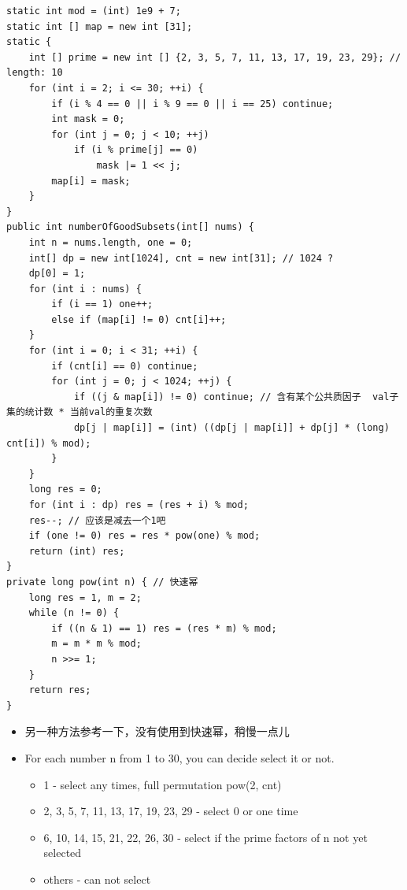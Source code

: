 \documentclass[9pt, b5paper]{article}
\begin{document}
\begin{verbatim}
static int mod = (int) 1e9 + 7;
static int [] map = new int [31];
static {
    int [] prime = new int [] {2, 3, 5, 7, 11, 13, 17, 19, 23, 29}; // length: 10
    for (int i = 2; i <= 30; ++i) {
        if (i % 4 == 0 || i % 9 == 0 || i == 25) continue;
        int mask = 0;
        for (int j = 0; j < 10; ++j) 
            if (i % prime[j] == 0)
                mask |= 1 << j;
        map[i] = mask;
    }
}
public int numberOfGoodSubsets(int[] nums) {
    int n = nums.length, one = 0;
    int[] dp = new int[1024], cnt = new int[31]; // 1024 ?
    dp[0] = 1;
    for (int i : nums) {
        if (i == 1) one++;
        else if (map[i] != 0) cnt[i]++;
    }
    for (int i = 0; i < 31; ++i) {
        if (cnt[i] == 0) continue;
        for (int j = 0; j < 1024; ++j) {
            if ((j & map[i]) != 0) continue; // 含有某个公共质因子  val子集的统计数 * 当前val的重复次数   
            dp[j | map[i]] = (int) ((dp[j | map[i]] + dp[j] * (long) cnt[i]) % mod);
        }
    }
    long res = 0;
    for (int i : dp) res = (res + i) % mod;
    res--; // 应该是减去一个1吧
    if (one != 0) res = res * pow(one) % mod;
    return (int) res;
}
private long pow(int n) { // 快速幂
    long res = 1, m = 2;
    while (n != 0) {
        if ((n & 1) == 1) res = (res * m) % mod;
        m = m * m % mod;
        n >>= 1;
    }
    return res;
}
\end{verbatim}
\begin{itemize}
\item 另一种方法参考一下，没有使用到快速幂，稍慢一点儿
\item For each number n from 1 to 30, you can decide select it or not.
\begin{itemize}
\item 1 - select any times, full permutation pow(2, cnt)
\item 2, 3, 5, 7, 11, 13, 17, 19, 23, 29 - select 0 or one time
\item 6, 10, 14, 15, 21, 22, 26, 30 - select if the prime factors of n not yet selected
\item others - can not select
\end{itemize}
\end{itemize}
\end{document}

